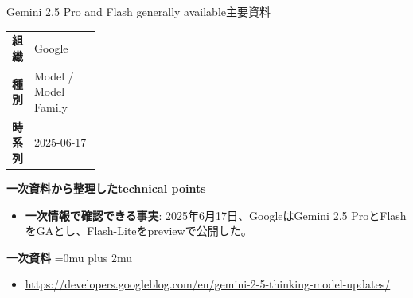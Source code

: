 \begin{technicalnote}{Gemini 2.5 Pro and Flash generally available}{主要資料}
\begingroup
\begin{tabularx}{\linewidth}{@{}>{\bfseries}p{0.22\linewidth}X@{}}
組織 & Google \\
種別 & Model / Model Family \\
時系列 & 2025-06-17 \\
\end{tabularx}
\smallskip
\begin{minipage}{\linewidth}
{\bfseries 一次資料から整理したtechnical points}
\begin{itemize}[leftmargin=1.5em,itemsep=0.35em]
\item \textbf{一次情報で確認できる事実}: 2025年6月17日、GoogleはGemini 2.5 ProとFlashをGAとし、Flash-Liteをpreviewで公開した。
\end{itemize}
\begin{samepage}
{\bfseries 一次資料}
\begingroup\sloppy
\Urlmuskip=0mu plus 2mu\relax
\begin{itemize}[leftmargin=1.5em,itemsep=0.25em]
\item {\scriptsize\url{https://developers.googleblog.com/en/gemini-2-5-thinking-model-updates/}}
\end{itemize}
\endgroup
\end{samepage}
\end{minipage}
\endgroup
\end{technicalnote}
\medskip
